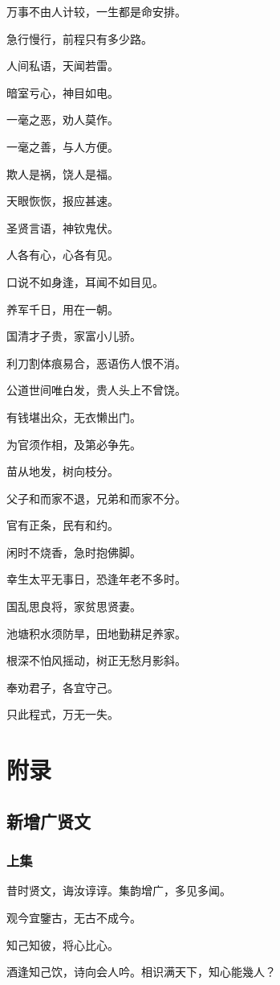 \documentclass[12pt,oneside]{book}
\begin{document}
万事不由人计较，一生都是命安排。

急行慢行，前程只有多少路。

人间私语，天闻若雷。

暗室亏心，神目如电。

一毫之恶，劝人莫作。

一毫之善，与人方便。

欺人是祸，饶人是福。

天眼恢恢，报应甚速。

圣贤言语，神钦鬼伏。

人各有心，心各有见。

口说不如身逢，耳闻不如目见。

养军千日，用在一朝。

国清才子贵，家富小儿骄。

利刀割体痕易合，恶语伤人恨不消。

公道世间唯白发，贵人头上不曾饶。

有钱堪出众，无衣懒出门。

为官须作相，及第必争先。

苗从地发，树向枝分。

父子和而家不退，兄弟和而家不分。

官有正条，民有和约。

闲时不烧香，急时抱佛脚。

幸生太平无事日，恐逢年老不多时。

国乱思良将，家贫思贤妻。

池塘积水须防旱，田地勤耕足养家。

根深不怕风摇动，树正无愁月影斜。

奉劝君子，各宜守己。

只此程式，万无一失。  
  
\part{附录}
\chapter{新增广贤文}
\section{上集}
昔时贤文，诲汝谆谆。集韵增广，多见多闻。

观今宜鑒古，无古不成今。

知己知彼，将心比心。

酒逢知己饮，诗向会人吟。相识满天下，知心能幾人？
\end{document}
